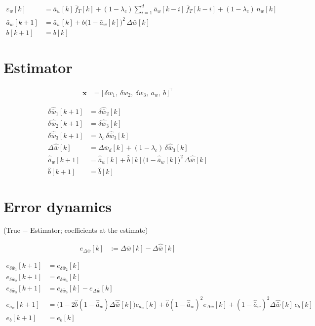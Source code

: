 \documentclass[11pt,a4paper,fontset=none]{ctexart}
\newcommand{\ba}{\bar{a}}
\newcommand{\bw}{\bar{w}}
\newcommand{\dW}{\Delta\bw}
\newcommand{\dWh}{\Delta\hat{\bw}}
\newcommand{\eD}{e_{\Delta\bw}}
\newcommand{\ah}{\hat{\ba}_w}
\newcommand{\bh}{\hat{b}}
\newcommand{\ea}{e_{\ba_w}}
\begin{document}
\begin{align*}
\varepsilon_w[k] &= \ba_w[k]\,\bar f_T[k] + (1-\lambda_c)\sum_{i=1}^{d}\ba_w[k-i]\,\bar f_T[k-i] + (1-\lambda_c)\,n_w[k] \\
\ba_w[k+1]       &= \ba_w[k] + b\bigl(1-\ba_w[k]\bigr)^{2}\,\dW[k] \\
b[k+1]           &= b[k]
\end{align*}

\section{Estimator}

\begin{align*}
\mathbf{x} &= \bigl[\,\delta\bw_1,\ \delta\bw_2,\ \delta\bw_3,\ \ba_w,\ b\,\bigr]^{\top}
\end{align*}

\begin{align*}
\delta\hat{\bw}_1[k+1] &= \delta\hat{\bw}_2[k] \\
\delta\hat{\bw}_2[k+1] &= \delta\hat{\bw}_3[k] \\
\delta\hat{\bw}_3[k+1] &= \lambda_c\,\delta\hat{\bw}_3[k] \\
\dWh[k]                &= \Delta\bw_d[k] + (1-\lambda_c)\,\delta\hat{\bw}_3[k] \\
\ah[k+1]               &= \ah[k] + \bh[k]\bigl(1-\ah[k]\bigr)^{2}\,\dWh[k] \\
\bh[k+1]               &= \bh[k]
\end{align*}

\section{Error dynamics}

(True $-$ Estimator; coefficients at the estimate)

\begin{align*}
\eD[k] &:= \dW[k] - \dWh[k]
\end{align*}

\begin{align*}
e_{\delta\bw_1}[k+1] &= e_{\delta\bw_2}[k] \\
e_{\delta\bw_2}[k+1] &= e_{\delta\bw_3}[k] \\
e_{\delta\bw_3}[k+1] &= e_{\delta\bw_3}[k] - \eD[k] \tag{5} \\
\ea[k+1]             &= \bigl(1 - 2\bh(1-\ah)\dWh[k]\bigr)\ea[k] + \bh(1-\ah)^{2}\eD[k] + (1-\ah)^{2}\dWh[k]\,e_b[k] \tag{6} \\
e_b[k+1]             &= e_b[k]
\end{align*}
\end{document}
